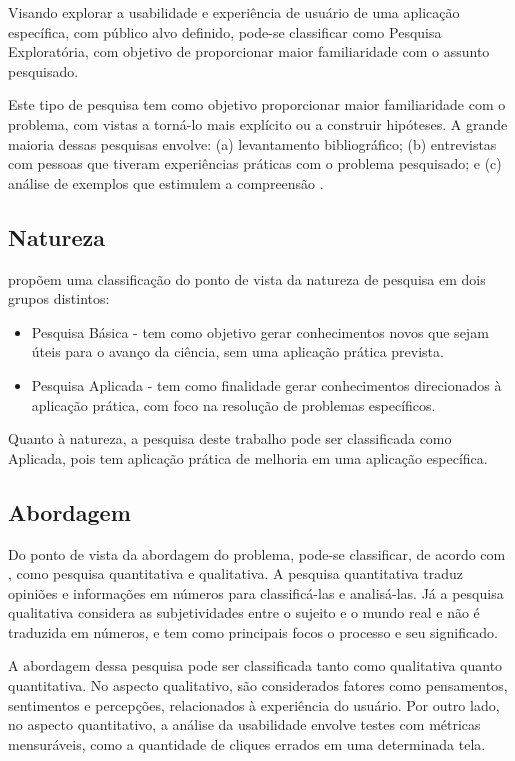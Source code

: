 Visando explorar a usabilidade e experiência de usuário de uma aplicação específica, com público alvo definido, pode-se classificar como Pesquisa Exploratória, com objetivo de proporcionar maior familiaridade 
com o assunto pesquisado.

Este tipo de pesquisa tem como objetivo proporcionar maior familiaridade com o problema, com vistas a torná-lo mais explícito ou a construir hipóteses. A grande maioria dessas pesquisas envolve: (a) levantamento 
bibliográfico; (b) 	entrevistas com pessoas que tiveram experiências práticas com o problema pesquisado; e (c) análise de exemplos que estimulem a compreensão \cite{gil2002}.

\subsection{Natureza}
\label{sec:Natureza}
 propõem uma classificação do ponto de vista da natureza de pesquisa em dois grupos distintos:

\begin{itemize}
	\item Pesquisa Básica - tem como objetivo gerar conhecimentos novos que sejam úteis para o avanço da ciência, sem uma aplicação prática prevista.
	\item Pesquisa Aplicada - tem como finalidade gerar conhecimentos direcionados à aplicação prática, com foco na resolução de problemas específicos.
\end{itemize}

Quanto à natureza, a pesquisa deste trabalho pode ser classificada como Aplicada, pois tem aplicação prática de melhoria em uma aplicação específica.

\subsection{Abordagem}
\label{sec:Abordagem}
Do ponto de vista da abordagem do problema, pode-se classificar, de acordo com , como pesquisa quantitativa e qualitativa. A pesquisa quantitativa traduz opiniões e informações em números para classificá-las e analisá-las. 
Já a pesquisa qualitativa considera as subjetividades entre o sujeito e o mundo real e não é traduzida em números, e tem como principais focos o processo e seu significado.

A abordagem dessa pesquisa pode ser classificada tanto como qualitativa quanto quantitativa. No aspecto qualitativo, são considerados fatores como pensamentos, sentimentos e percepções, relacionados à experiência 
do usuário. Por outro lado, no aspecto quantitativo, a análise da usabilidade envolve testes com métricas mensuráveis, como a quantidade de cliques errados em uma determinada tela.

